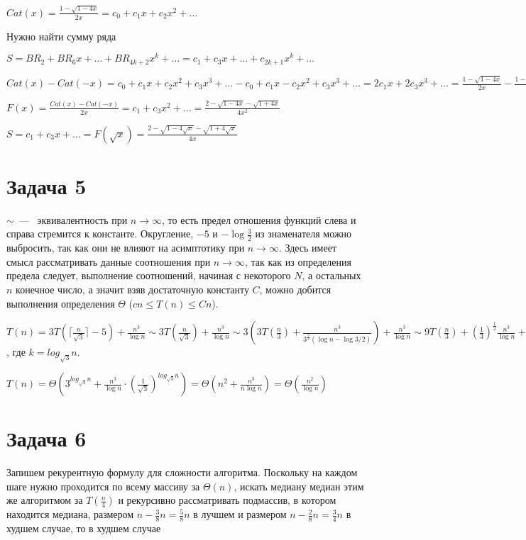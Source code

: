 \documentclass[a4paper,12pt]{article} %
\begin{document}
$Cat(x)=\frac{1-\sqrt{1-4x}}{2x}=c_0+c_1x+c_2x^2+\ldots$

Нужно найти сумму ряда

$S=BR_{2}+BR_6x+\ldots+BR_{4k+2}x^k+\ldots=c_{1}+c_3x+\ldots+c_{2k+1}x^k+\ldots$

$Cat(x)-Cat(-x)=c_0+c_1x+c_2x^2+c_3x^3+\ldots-c_0+c_1x-c_2x^2+c_3x^3+\ldots=2c_1x+2c_3x^3+\ldots=\frac{1-\sqrt{1-4x}}{2x}-\frac{1-\sqrt{1+4x}}{-2x}=\frac{2-\sqrt{1-4x}-\sqrt{1+4x}}{2x}$

$F(x)=\frac{Cat(x)-Cat(-x)}{2x}=c_1+c_3x^2+\ldots=\frac{2-\sqrt{1-4x}-\sqrt{1+4x}}{4x^2}$

$S=c_1+c_3x+\ldots=F(\sqrt{x})=\frac{2-\sqrt{1-4\sqrt{x}}-\sqrt{1+4\sqrt{x}}}{4x}$


\section{Задача 5}
\hspace{5mm}
$\sim$~---~ эквивалентность при $n\rightarrow\infty$, то есть предел отношения функций слева и справа стремится к константе. Округление, $-5$ и $-\log{\frac{3}{2}}$ из знаменателя можно выбросить, так как они не влияют на асимптотику при $n\rightarrow\infty$. Здесь имеет смысл рассматривать данные соотношения при $n\rightarrow\infty$, так как из определения предела следует, выполнение соотношений, начиная с некоторого $N$, а остальных $n$ конечное число, а значит взяв достаточную константу $C$, можно добится выполнения определения $\Theta$ ($cn\leq T(n)\leq Cn$).

$T(n)=3T(\lceil\frac{n}{\sqrt{3}}\rceil-5)+\frac{n^3}{\log{n}}
\sim3T(\frac{n}{\sqrt{3}})+\frac{n^3}{\log{n}}\sim
3(3T(\frac{n}{3})+\frac{n^3}{3^{\frac{3}{2}}(\log{n}-\log{3/2})})+\frac{n^3}{\log{n}}\sim
9T(\frac{n}{3})+({\frac{1}{3}})^{\frac{1}{2}}\frac{n^3}{\log{n}}+\frac{n^3}{\log{n}})\sim\ldots\sim
(3^{k}T(\frac{n}{3^k})+\frac{n^3}{\log{n}}\cdot (1+({\frac{1}{3}})^{\frac{1}{2}}+\ldots+({\frac{1}{3}})^{\frac{1}{2}k})\sim
(3^k T(1)+\frac{n^3}{\log{n}}\cdot \Theta(({\frac{1}{\sqrt{3}}})^{k})$, где $k=log_{\sqrt{3}}{n}$.

$T(n)=\Theta(3^{log_{\sqrt{3}}{n}}+\frac{n^3}{\log{n}}\cdot ({\frac{1}{\sqrt{3}}})^{log_{\sqrt{3}}{n}})=\Theta(n^2+\frac{n^3}{n\log{n}})=\Theta(\frac{n^2}{\log{n}})$

\section{Задача 6}
\hspace{5mm}
Запишем рекурентную формулу для сложности алгоритма. Поскольку на каждом шаге нужно проходится по всему массиву за $\Theta(n)$, искать медиану медиан этим же алгоритмом за $T(\frac{n}{4})$ и рекурсивно рассматривать подмассив, в котором находится медиана, размером $n-\frac{3}{8}n=\frac{5}{8}n$ в лучшем и размером $n-\frac{2}{8}n=\frac{3}{4}n$ в худшем случае, то в худшем случае 
\end{document}
